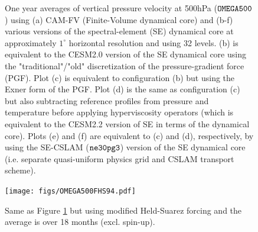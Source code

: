 \documentclass[draft]{agujournal2019}
\begin{document}
\begin{figure}[t]
\caption{One year averages of vertical pressure velocity at 500hPa ($\tt OMEGA500$) using (a) CAM-FV (Finite-Volume dynamical core) and (b-f) various versions of the spectral-element (SE) dynamical core at approximately $1^{\circ}$ horizontal resolution and using 32 levels. (b) is equivalent to the CESM2.0 version of the SE dynamical core using the "traditional"/"old" discretization of the pressure-gradient force (PGF). Plot (c) is equivalent to configuration (b) but using the Exner form of the PGF. Plot (d) is the same as configuration (c) but also subtracting reference profiles from pressure and temperature before applying hyperviscosity operators (which is equivalent to the CESM2.2 version of SE in terms of the dynamical core). Plots (e) and (f) are equivalent to (c) and (d), respectively, by using the SE-CSLAM ($\tt ne30pg3$) version of the SE dynamical core (i.e. separate quasi-uniform physics grid and CSLAM transport scheme).}\label{fig:OMEGA500}
\end{figure}
\begin{figure}[t]
\begin{center}
\texttt{[image: figs/OMEGA500FHS94.pdf]}
\end{center}
\caption{Same as Figure \ref{fig:OMEGA500} but using modified Held-Suarez forcing and the average is over 18 months (excl. spin-up).}\label{fig:OMEGA500FHS94}
\end{figure}

%
%

%

%
\end{document}
